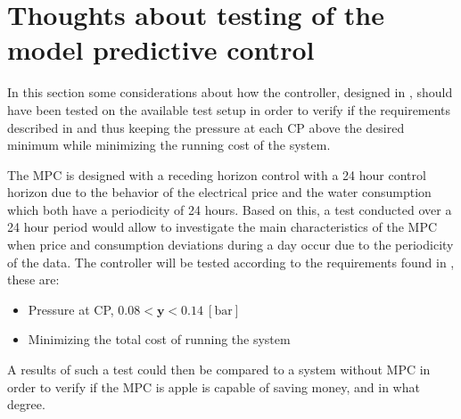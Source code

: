 \chapter{Thoughts about testing of the model predictive control}
\label{sec:MPT_test}

In this section some considerations about how the controller, designed in , should have been tested on the available test setup in order to verify if the requirements described in  and thus keeping the pressure at each CP above the desired minimum while minimizing the running cost of the system.


The MPC is designed with a receding horizon control with a 24 hour control horizon due to the behavior of the electrical price and the water consumption which both have a periodicity of 24 hours. 
Based on this, a test conducted over a 24 hour period would allow to investigate the main characteristics of the MPC when price and consumption deviations during a day occur due to the periodicity of the data. The controller will be tested according to the requirements found in , these are: 
\begin{itemize}
	\item Pressure at CP, $0.08 < \bm{y} < 0.14 \:[\text{bar}]$
%
	\item Minimizing the total cost of running the system
\end{itemize}    

A results of such a test could then be compared to a system without MPC in order to verify if the MPC is apple is capable of saving money, and in what degree.  



